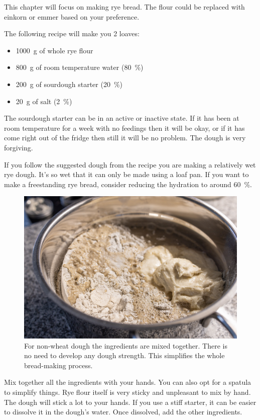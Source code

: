 This chapter will focus on making rye bread. The flour could
be replaced with einkorn or emmer based on your preference.

The following recipe will make you 2 loaves:
\begin{itemize}
  \item \qty{1000}{\gram} of whole rye flour
  \item \qty{800}{\gram} of room temperature water (\qty{80}{\percent})
  \item \qty{200}{\gram} of sourdough starter (\qty{20}{\percent})
  \item \qty{20}{\gram} of salt (\qty{2}{\percent})
\end{itemize}

The sourdough starter can be in an active or inactive state. If it has been
at room temperature for a week with no feedings then it will be okay, or 
if it has come right out of the fridge then still it will be no problem.
The dough is very forgiving.

If you follow the suggested dough from the recipe you are making a relatively
wet rye dough. It's so wet that it can only be made using a loaf pan. If
you want to make a freestanding rye bread, consider reducing the hydration
to around \qty{60}{\percent}.

\begin{figure}[!htb]
  \includegraphics[width=\textwidth]{ingredients}
  \caption{For non-wheat dough the ingredients are mixed together. There is no need
  to develop any dough strength. This simplifies the whole bread-making
  process.}%
  \label{fig:non-wheat-ingredients}
\end{figure}

Mix together all the ingredients with your hands. You can also
opt for a spatula to simplify things. Rye flour itself is very
sticky and unpleasant to mix by hand. The dough will stick
a lot to your hands. If you use a stiff starter, it can be
easier to dissolve it in the dough's water. Once dissolved,
add the other ingredients.

